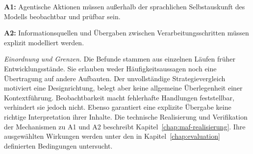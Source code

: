 \textbf{A1:} Agentische Aktionen müssen außerhalb der sprachlichen
Selbstauskunft des Modells beobachtbar und prüfbar sein.

\textbf{A2:} Informationsquellen und Übergaben zwischen
Verarbeitungsschritten müssen explizit modelliert werden.

\emph{Einordnung und Grenzen.} Die Befunde stammen aus einzelnen
Läufen früher Entwicklungsstände. Sie erlauben weder
Häufigkeitsaussagen noch eine Übertragung auf andere Aufbauten.
Der unvollständige Strategievergleich motiviert eine Designrichtung,
belegt aber keine allgemeine Überlegenheit einer Kontextführung.
Beobachtbarkeit macht fehlerhafte Handlungen feststellbar, verhindert
sie jedoch nicht. Ebenso garantiert eine explizite Übergabe keine
richtige Interpretation ihrer Inhalte. Die technische Realisierung
und Verifikation der Mechanismen zu A1 und A2 beschreibt
Kapitel~\ref{chap:maf-realisierung}. Ihre ausgewählten Wirkungen werden
unter den in Kapitel~\ref{chap:evaluation} definierten Bedingungen
untersucht.

